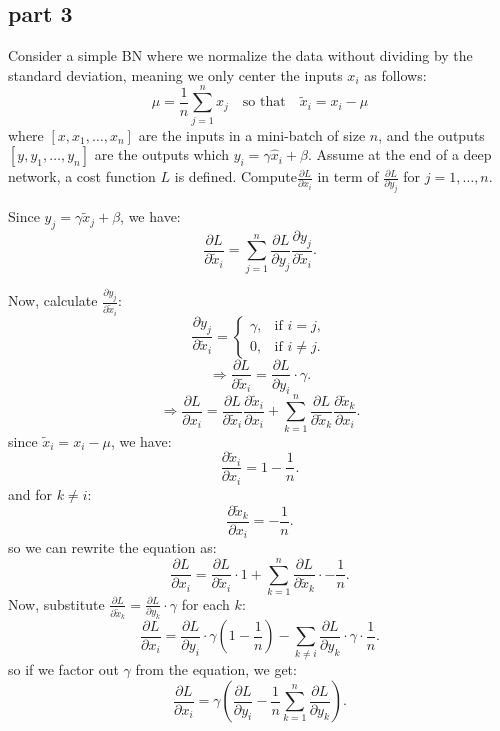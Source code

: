 \subsection{part 3}
Consider a simple BN where we normalize the data without dividing by the standard deviation, meaning we only center the inputs \( x_i \) as follows:
\[
\mu = \frac{1}{n} \sum_{j=1}^{n} x_j \quad \text{so that} \quad \tilde{x}_i = x_i - \mu
\]
where \( [x, x_1, \ldots, x_n] \) are the inputs in a mini-batch of size \( n \), and the outputs \( [y, y_1, \ldots, y_n] \) are the outputs which $y_i = \gamma \hat{x}_i + \beta $. Assume at the end of a deep network, a cost function \( L \) is defined. Compute\( \frac{\partial L}{\partial x_i} \) in term of \( \frac{\partial L}{\partial y_j} \) for \( j = 1, \ldots, n \).
\begin{qsolve}
    \begin{qsolve}[]
        Since \( y_j = \gamma \tilde{x}_j + \beta \), we have:
        \[
        \frac{\partial L}{\partial \tilde{x}_i} = \sum_{j=1}^n \frac{\partial L}{\partial y_j} \frac{\partial y_j}{\partial \tilde{x}_i}.
        \]

        Now, calculate \( \frac{\partial y_j}{\partial \tilde{x}_i} \):
        \[
        \frac{\partial y_j}{\partial \tilde{x}_i} = 
        \begin{cases}
        \gamma, & \text{if } i = j, \\
        0, & \text{if } i \neq j.
        \end{cases}
        \]
        \[
        \Rightarrow\frac{\partial L}{\partial \tilde{x}_i} = \frac{\partial L}{\partial y_i} \cdot \gamma.
        \]
        \[
        \Rightarrow\frac{\partial L}{\partial x_i} = \frac{\partial L}{\partial \tilde{x}_i} \frac{\partial \tilde{x}_i}{\partial x_i} + \sum_{k=1}^n \frac{\partial L}{\partial \tilde{x}_k} \frac{\partial \tilde{x}_k}{\partial x_i}.
        \]
        since \( \tilde{x}_i = x_i - \mu \), we have:
        \[
        \frac{\partial \tilde{x}_i}{\partial x_i} = 1 - \frac{1}{n}.
        \]
        and for \( k \neq i \):
        \[
        \frac{\partial \tilde{x}_k}{\partial x_i} = -\frac{1}{n}.
        \]
        so we can rewrite the equation as:
        \[
        \frac{\partial L}{\partial x_i} = \frac{\partial L}{\partial \tilde{x}_i} \cdot 1 + \sum_{k=1}^n \frac{\partial L}{\partial \tilde{x}_k} \cdot -\frac{1}{n}.
        \]
        Now, substitute \( \frac{\partial L}{\partial \tilde{x}_k} = \frac{\partial L}{\partial y_k} \cdot \gamma \) for each \( k \):
        \[
        \frac{\partial L}{\partial x_i} = \frac{\partial L}{\partial y_i} \cdot \gamma \left(1 - \frac{1}{n}\right) - \sum_{k \neq i} \frac{\partial L}{\partial y_k} \cdot \gamma \cdot \frac{1}{n}.
        \]  
        so if we factor out \( \gamma \) from the equation, we get:
        \[
        \frac{\partial L}{\partial x_i} = \gamma \left(\frac{\partial L}{\partial y_i} - \frac{1}{n} \sum_{k=1}^n \frac{\partial L}{\partial y_k}\right).
        \]
    \end{qsolve}
\end{qsolve}
